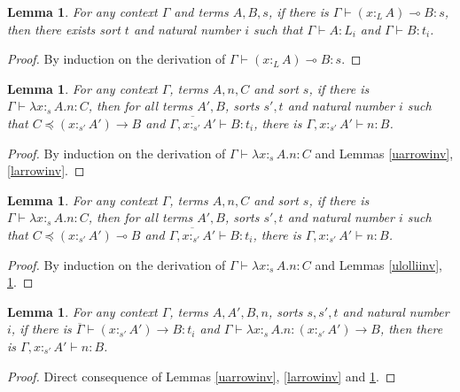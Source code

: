\documentclass{article}
\newtheorem{lemma}[theorem]{Lemma}
\theoremstyle{definition}
\newcommand{\ltype}{:_{\scriptscriptstyle L}}
\newcommand{\stype}[1]{:_{#1}}
\begin{document}
\begin{lemma}\label{llolliinv}
  For any context $\Gamma$ and terms $A, B, s$, if there is $\Gamma \vdash (x \ltype A)\multimap B : s$, then there exists sort $t$ and natural number $i$ such that $\Gamma \vdash A : L_i$ and $\Gamma \vdash B : t_i$.
\end{lemma}
\begin{proof}
  By induction on the derivation of $\Gamma \vdash (x \ltype A) \multimap B : s$.
\end{proof}

\begin{lemma}\label{arrowlaminvx}
  For any context $\Gamma$, terms $A, n, C$ and sort $s$, if there is $\Gamma \vdash \lambda x \stype{s} A . n : C$, then for all terms $A', B$, sorts $s', t$ and natural number $i$ such that $C \preceq (x \stype{s'} A') \rightarrow B$ and $\overline{\Gamma, x \stype{s'} A'} \vdash B : t_i$, there is $\Gamma, x \stype{s'} A' \vdash n : B$.
\end{lemma}
\begin{proof}
  By induction on the derivation of $\Gamma \vdash \lambda x \stype{s} A . n : C$ and Lemmas \ref{uarrowinv}, \ref{larrowinv}.
\end{proof}

\begin{lemma}\label{lollilaminvx}
  For any context $\Gamma$, terms $A, n, C$ and sort $s$, if there is $\Gamma \vdash \lambda x \stype{s} A . n : C$, then for all terms $A', B$, sorts $s', t$ and natural number $i$ such that $C \preceq (x \stype{s'} A') \multimap B$ and $\overline{\Gamma, x \stype{s'} A'} \vdash B : t_i$, there is $\Gamma, x \stype{s'} A' \vdash n : B$.
\end{lemma}
\begin{proof}
  By induction on the derivation of $\Gamma \vdash \lambda x \stype{s} A . n : C$ and Lemmas \ref{ulolliinv}, \ref{llolliinv}.
\end{proof}

\begin{lemma}\label{arrowlaminv}
  For any context $\Gamma$, terms $A, A', B, n$, sorts $s, s', t$ and natural number $i$, if there is $\overline{\Gamma} \vdash (x \stype{s'} A') \rightarrow B : t_i$ and $\Gamma \vdash \lambda x \stype{s} A . n : (x \stype{s'} A') \rightarrow B$, then there is $\Gamma, x \stype{s'} A' \vdash n : B$.
\end{lemma}
\begin{proof}
  Direct consequence of Lemmas \ref{uarrowinv}, \ref{larrowinv} and \ref{arrowlaminvx}.
\end{proof}
\end{document}
